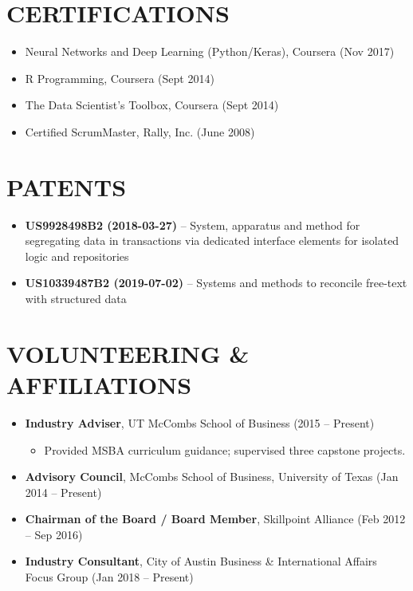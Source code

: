 \documentclass[11pt]{article}
\begin{document}
\section*{CERTIFICATIONS}
\begin{itemize}[leftmargin=*]
  \item Neural Networks and Deep Learning (Python/Keras), Coursera (Nov 2017)
  \item R Programming, Coursera (Sept 2014)
  \item The Data Scientist’s Toolbox, Coursera (Sept 2014)
  \item Certified ScrumMaster, Rally, Inc. (June 2008)
\end{itemize}

\section*{PATENTS}
\begin{itemize}[leftmargin=*]
  \item \textbf{US9928498B2 (2018-03-27)} -- System, apparatus and method for segregating data in transactions via dedicated interface elements for isolated logic and repositories
  \item \textbf{US10339487B2 (2019-07-02)} -- Systems and methods to reconcile free-text with structured data
\end{itemize}

\section*{VOLUNTEERING \& AFFILIATIONS}
\begin{itemize}[leftmargin=*]
  \item \textbf{Industry Adviser}, UT McCombs School of Business (2015 -- Present)
    \begin{itemize}
      \item Provided MSBA curriculum guidance; supervised three capstone projects.
    \end{itemize}
  \item \textbf{Advisory Council}, McCombs School of Business, University of Texas (Jan 2014 -- Present)
  \item \textbf{Chairman of the Board / Board Member}, Skillpoint Alliance (Feb 2012 -- Sep 2016)
  \item \textbf{Industry Consultant}, City of Austin Business \& International Affairs Focus Group (Jan 2018 -- Present)
\end{itemize}
\end{document}
